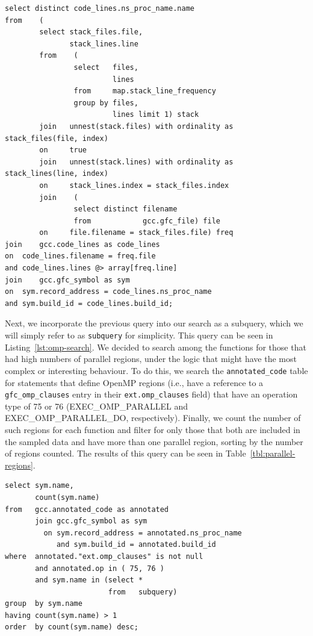 \begin{lstlisting}[caption=Determing Functions Sampled, label=lst:restrict]
select distinct code_lines.ns_proc_name.name
from	(
		select stack_files.file,
		       stack_lines.line
		from	(
				select   files,
				         lines
				from     map.stack_line_frequency
				group by files,
				         lines limit 1) stack
		join   unnest(stack.files) with ordinality as stack_files(file, index)
		on     true
		join   unnest(stack.lines) with ordinality as stack_lines(line, index)
		on     stack_lines.index = stack_files.index
		join	(
				select distinct filename
				from            gcc.gfc_file) file
		on     file.filename = stack_files.file) freq
join	gcc.code_lines as code_lines
on	code_lines.filename = freq.file
and	code_lines.lines @> array[freq.line]
join	gcc.gfc_symbol as sym
on	sym.record_address = code_lines.ns_proc_name
and	sym.build_id = code_lines.build_id;
\end{lstlisting}

Next, we incorporate the previous query into our search as a subquery, which we will simply refer to as \texttt{subquery} for simplicity.
This query can be seen in Listing~\ref{lst:omp-search}.
We decided to search among the functions for those that had high numbers of parallel regions, under the logic that might have the most complex or interesting behaviour.
To do this, we search the \texttt{annotated\_code} table for statements that define OpenMP regions (i.e., have a reference to a \texttt{gfc\_omp\_clauses} entry in their \texttt{ext.omp\_clauses} field) that have an operation type of 75 or 76 (EXEC\_OMP\_PARALLEL and EXEC\_OMP\_PARALLEL\_DO, respectively).
Finally, we count the number of such regions for each function and filter for only those that both are included in the sampled data and have more than one parallel region, sorting by the number of regions counted.
The results of this query can be seen in Table~\ref{tbl:parallel-regions}.

\begin{lstlisting}[caption=Finding High Concentrations of OpenMP Parallel Regions, label=lst:omp-search]
select sym.name,
       count(sym.name)
from   gcc.annotated_code as annotated
       join gcc.gfc_symbol as sym
         on sym.record_address = annotated.ns_proc_name
            and sym.build_id = annotated.build_id
where  annotated."ext.omp_clauses" is not null
       and annotated.op in ( 75, 76 )
       and sym.name in (select *
                        from   subquery)
group  by sym.name
having count(sym.name) > 1
order  by count(sym.name) desc;  
\end{lstlisting}

